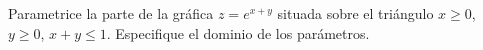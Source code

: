 Parametrice la parte de la gráfica $z=e^{x+y}$ situada sobre el triángulo $x\geq0$, $y\geq0$, $x+y\leq1$. Especifique el dominio de los parámetros.
